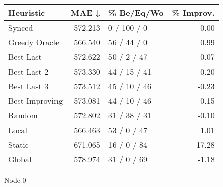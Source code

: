 \begin{tabular}{lrlr}
\toprule
\textbf{Heuristic} & \textbf{MAE ↓} & \textbf{\% Be/Eq/Wo} & \textbf{\% Improv.} \\
\midrule
            Synced &        572.213 &          0 / 100 / 0 &                0.00 \\
     Greedy Oracle &        566.540 &          56 / 44 / 0 &                0.99 \\
         Best Last &        572.622 &          50 / 2 / 47 &               -0.07 \\
       Best Last 2 &        573.330 &         44 / 15 / 41 &               -0.20 \\
       Best Last 3 &        573.512 &         45 / 10 / 46 &               -0.23 \\
    Best Improving &        573.081 &         44 / 10 / 46 &               -0.15 \\
            Random &        572.802 &         31 / 38 / 31 &               -0.10 \\
             Local &        566.463 &          53 / 0 / 47 &                1.01 \\
            Static &        671.065 &          16 / 0 / 84 &              -17.28 \\
            Global &        578.974 &          31 / 0 / 69 &               -1.18 \\
\bottomrule
\end{tabular}
\caption{Node 0}
\label{tab:iid_lr05_le2_bs4_0}
